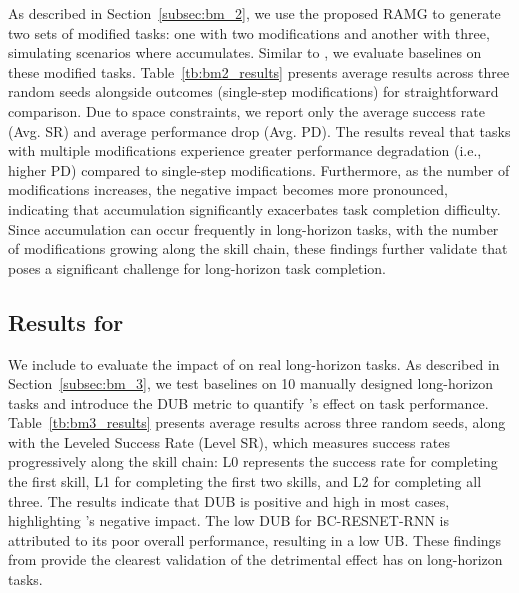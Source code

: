 As described in Section~\ref{subsec:bm_2}, we use the proposed RAMG to generate two sets of modified tasks: one with two modifications and another with three, simulating scenarios where \pb accumulates. Similar to \bma, we evaluate baselines on these modified tasks. Table~\ref{tb:bm2_results} presents average results across three random seeds alongside \bma outcomes (single-step modifications) for straightforward comparison. Due to space constraints, we report only the average success rate (Avg. SR) and average performance drop (Avg. PD). The results reveal that tasks with multiple modifications experience greater performance degradation (i.e., higher PD) compared to single-step modifications. Furthermore, as the number of modifications increases, the negative impact becomes more pronounced, indicating that \pb accumulation significantly exacerbates task completion difficulty. Since \pb accumulation can occur frequently in long-horizon tasks, with the number of modifications growing along the skill chain, these findings further validate that \pb poses a significant challenge for long-horizon task completion.



\subsection{Results for \bmc}
\label{subsec:results_bmc}



We include \bmc to evaluate the impact of \pb on real long-horizon tasks. As described in Section~\ref{subsec:bm_3}, we test baselines on 10 manually designed long-horizon tasks and introduce the DUB metric to quantify \pb's effect on task performance. Table~\ref{tb:bm3_results} presents average results across three random seeds, along with the Leveled Success Rate (Level SR), which measures success rates progressively along the skill chain: L0 represents the success rate for completing the first skill, L1 for completing the first two skills, and L2 for completing all three. The results indicate that DUB is positive and high in most cases, highlighting \pb's negative impact. The low DUB for BC-RESNET-RNN is attributed to its poor overall performance, resulting in a low UB. These findings from \bmc provide the clearest validation of the detrimental effect \pb has on long-horizon tasks. 

